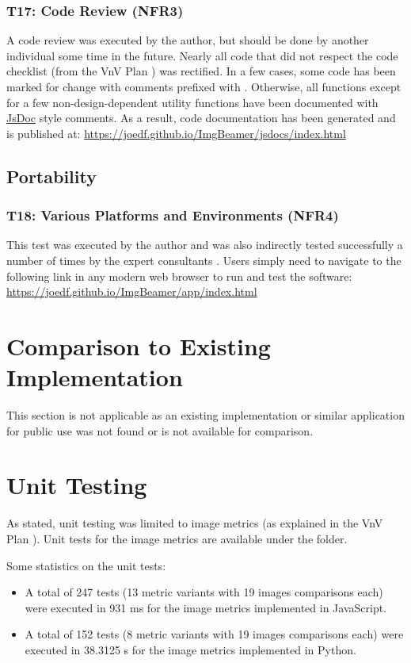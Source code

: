 \documentclass[12pt, titlepage]{article}
\begin{document}
\subsubsection{T17: Code Review (NFR3)}
A code review was executed by the author, but should be done by another individual some time in the future.
Nearly all code that did not respect the code checklist (from the VnV Plan \cite{VnV_plan})
was rectified. In a few cases, some code has been marked for change with comments prefixed with
. Otherwise, all functions except for a few non-design-dependent utility functions
have been documented with \href{https://github.com/jsdoc/jsdoc}{JsDoc} style comments.
As a result, code documentation has been generated and is published at:
\url{https://joedf.github.io/ImgBeamer/jsdocs/index.html}

\subsection{Portability} \label{ss_portability}
\subsubsection{T18: Various Platforms and Environments (NFR4)}
This test was executed by the author and was also indirectly tested successfully a number of times
by the expert consultants \cite{VnV_plan}. Users simply need to navigate to the following link
in any modern web browser to run and test the software:
\url{https://joedf.github.io/ImgBeamer/app/index.html}
	
\section{Comparison to Existing Implementation}	

This section is not applicable as an existing implementation or similar application
for public use was not found or is not available for comparison.

\section{Unit Testing} \label{ss_unittest}
As stated, unit testing was limited to image metrics (as explained in the VnV Plan \cite{VnV_plan}).
Unit tests for the image metrics are available under the  folder.

Some statistics on the unit tests:
\begin{itemize}
  \item A total of 247 tests (13 metric variants with 19 images comparisons each) were
    executed in 931 \si{ms} for the image metrics implemented in JavaScript.
  \item A total of 152 tests (8 metric variants with 19 images comparisons each) were
    executed in 38.3125 \si{s} for the image metrics implemented in Python.
\end{itemize}
\end{document}
